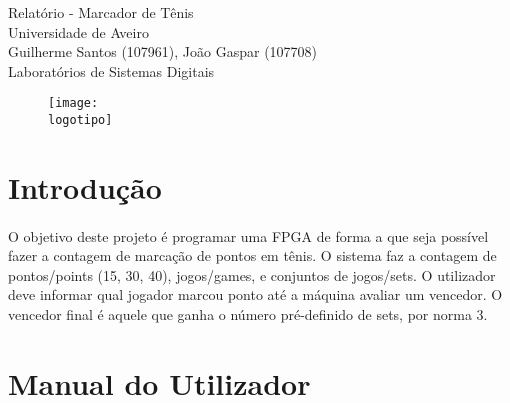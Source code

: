 \documentclass[a4paper, 11pt, oneside]{report}
\begin{document}
\onehalfspacing
\def\titulo{Relatório - Marcador de Tênis}
\def\autores{Guilherme Santos (107961), João Gaspar (107708)}
\def\unidadecurricular{Laboratórios de Sistemas Digitais}
\def\empresa{Universidade de Aveiro}
\def\logotipo{ua.pdf}

\begin{titlepage}

\begin{center}
\vspace*{30mm}
{\Huge \titulo}\\ 
\vspace{10mm}
{\Large \empresa}\\
\vspace{10mm}
{\LARGE \autores}\\ 
\vspace{10mm}
{\LARGE \unidadecurricular}\\ 
\vspace{30mm}
\begin{figure}[h]
\center
\texttt{[image: \\logotipo]}
\end{figure}
\vspace{30mm}
\end{center}

\end{titlepage}

\renewcommand\thesection{}

\tableofcontents

\paragraph{}

\section{Introdução}

\paragraph{} O objetivo deste projeto é programar uma FPGA de forma a que seja possível fazer a contagem de marcação de pontos em tênis. O sistema faz a contagem de pontos/points (15, 30, 40), jogos/games, e conjuntos de jogos/sets. O utilizador deve informar qual jogador marcou ponto até a máquina avaliar um vencedor. O vencedor final é aquele que ganha o número pré-definido de sets, por norma 3. \\

\section{Manual do Utilizador}
\end{document}
